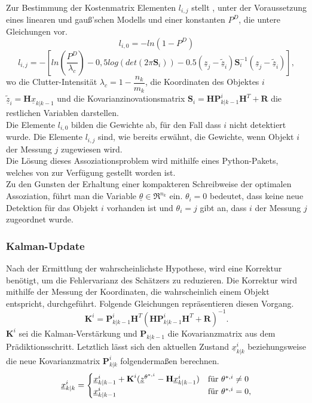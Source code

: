 \documentclass[10pt,a4paper]{article}
\begin{document}
Zur Bestimmung der Kostenmatrix Elementen $l_{i,j}$ stellt \cite{MOTyoutube}, unter der Voraussetzung eines linearen und gauß'schen Modells und einer konstanten $P^D$, die untere Gleichungen vor.
\begin{equation}
\label{eq:GNNKostenMatrix}
l_{i,0} = - ln(1-P^D)
\end{equation}
\begin{equation*}
l_{i,j} = - [ln(\dfrac{P^D}{\lambda_c})-0,5log(det(2\pi\textbf{S}_i))-0.5(\underline{z}_j- \tilde{\underline{z}}_i)\textbf{S}_i^{-1}(\underline{z}_j- \tilde{\underline{z}}_i)],
\end{equation*}
wo die Clutter-Intensität $\lambda_c = 1- \dfrac{n_k}{m_k}$, die Koordinaten des Objektes $i$ $\tilde{\underline{z}}_i = \textbf{H}\underline{x}_{k|k-1}$ und die Kovarianzinovationsmatrix $\textbf{S}_i = \textbf{H}\textbf{P}_{k|k-1}^i\textbf{H}^T+\textbf{R}$ die restlichen Variablen darstellen.\\
Die Elemente $l_{i,0}$ bilden die Gewichte ab, für den Fall dass $i$ nicht detektiert wurde. Die Elemente $l_{i,j}$ sind, wie bereits erwähnt, die Gewichte, wenn Objekt $i$ der Messung $j$ zugewiesen wird. \\
Die Lösung dieses Assoziationsproblem wird mithilfe eines Python-Pakets, welches von \cite{HungarianPython} zur Verfügung gestellt worden ist. \\
Zu den Gunsten der Erhaltung einer kompakteren Schreibweise der optimalen Assoziation, führt man die Variable $\underline{\theta} \in \Re^{n_k}$ ein.  $\theta_i = 0$ bedeutet, dass keine neue Detektion für das Objekt $i$ vorhanden ist und $\theta_i = j$ gibt an, dass $i$ der Messung $j$ zugeordnet wurde.
\subsubsection{Kalman-Update}
Nach der Ermittlung der wahrscheinlichste Hypothese, wird eine Korrektur benötigt, um die Fehlervarianz des Schätzers zu reduzieren. Die Korrektur wird mithilfe der Messung der Koordinaten, die wahrscheinlich einem Objekt entspricht, durchgeführt. Folgende Gleichungen repräsentieren diesen Vorgang.
\begin{equation}
\textbf{K}^i =  \textbf{P}_{k|k-1}^i\textbf{H}^T(\textbf{H}\textbf{P}_{k|k-1}^i\textbf{H}^T + \textbf{R})^{-1}.
\end{equation}
$\textbf{K}^i$ sei die Kalman-Verstärkung und $\textbf{P}_{k|k-1}$ die Kovarianzmatrix aus dem Prädiktionsschritt. Letztlich lässt sich den aktuellen Zustand $\underline{x}^i_{k|k}$ beziehungsweise die neue Kovarianzmatrix $\textbf{P}_{k|k}^i$ folgendermaßen berechnen.
\begin{equation}
\label{eq:GNNUpdate}
\underline{x}^i_{k|k} = \begin{cases}
\underline{x}^i_{k|k-1}+\textbf{K}^i(\underline{z}^{\theta^{*,i}}- \textbf{H}\underline{x}^i_{k|k-1}) &$für $ \theta^{*,i} \neq 0 \\
\underline{x}^i_{k|k-1} & $für $ \theta^{*,i} = 0,
\end{cases}
\end{equation}
\end{document}
